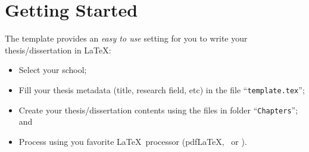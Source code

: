 %
%




\section{Getting Started}
\label{sec:getting_started}

The template provides an \emph{easy to use} setting for you to write your thesis/dissertation in \LaTeX:
\begin{itemize}
  \item  Select your school;
  \item Fill your thesis metadata (title, research field, etc) in the file “\texttt{template.tex}”;
  \item Create your thesis/dissertation contents using the files in folder “\texttt{Chapters}”; and
  \item Process using you favorite \LaTeX\ processor (pdf\LaTeX, \XeLaTeX\ or \LuaLaTeX).
\end{itemize}

